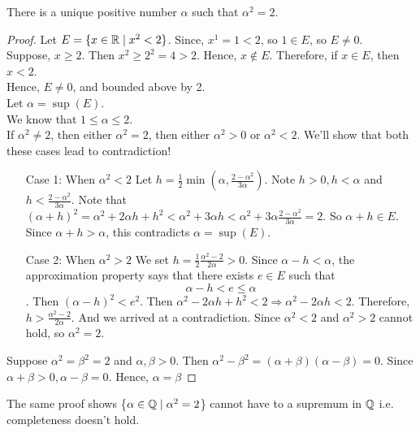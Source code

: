 \documentclass[11pt]{article}
\begin{document}
\begin{theorem}
    There is a unique positive number \(\alpha\) such that \(\alpha^2 = 2\).
\end{theorem}

\begin{proof}
    Let \(E = \{x \in \mathbb R \mid x^2 < 2\}\). Since, \(x^1 = 1 < 2\), so \(1 \in E\), so \(E \neq 0\). \\
    Suppose, \(x \geqslant 2\). Then \(x^2 \geqslant 2^2 = 4 > 2\). Hence, \(x \notin E\).
    Therefore, if \(x \in E\), then \(x < 2\). \\
    Hence, \(E \neq 0\), and bounded above by 2. \\
    Let \(\alpha = \sup(E)\). \\
    We know that \(1 \leqslant \alpha \leqslant 2\). \\
    If \(\alpha^2 \neq 2\), then either \(\alpha^2 = 2\), then either \(\alpha^2 > 0\) or \(\alpha^2 < 2\). We'll show that both these cases lead to contradiction!
    \begin{itemize}
        \item[Case 1:] When \(\alpha^2 < 2\) Let \(h = \frac{1}{2} \min(\alpha, \frac{2 -
                \alpha^2}{3\alpha})\). Note \(h > 0, h < \alpha\) and \(h < \frac{2
                -\alpha^2}{3\alpha}\). Note that \((\alpha + h)^2 = \alpha^2 + 2\alpha h + h^2
            < \alpha^2 + 3\alpha h < \alpha^2 + 3\alpha \frac{2 - \alpha^2}{3\alpha} = 2\).
            So \(\alpha + h \in E\). Since \(\alpha + h > \alpha\), this contradicts
            \(\alpha = \sup(E)\).
        \item[Case 2:] When \(\alpha^2 > 2\) We set \(h = \frac{1}{2} \frac{\alpha^2 -
                2}{2\alpha} > 0\). Since \(\alpha - h < \alpha\), the approximation property
            says that there exists \(e \in E\) such that \[\alpha - h < e \leqslant \alpha\]. Then \((\alpha - h)^2 < e^2\). Then \(\alpha^2 - 2\alpha h + h^2 < 2 \Rightarrow \alpha^2 - 2\alpha h < 2\). Therefore, \(h > \frac{\alpha^2 - 2}{2\alpha}\). And we arrived at a contradiction. Since \(\alpha^2 < 2\) and \(\alpha^2 > 2\) cannot hold, so \(\alpha^2 = 2\).
    \end{itemize}
    Suppose \(\alpha^2 = \beta^2 = 2\) and \(\alpha, \beta > 0\). Then \(\alpha^2 - \beta^2 = (\alpha + \beta)(\alpha - \beta) = 0\). Since \(\alpha + \beta > 0, \alpha - \beta = 0 \). Hence, \(\alpha = \beta\)
\end{proof}

\begin{remark}
    The same proof shows \{\(\alpha \in \mathbb Q \mid \alpha^2 = 2\)\} cannot have to a supremum in \(\mathbb Q\) i.e. completeness doesn't hold.
\end{remark}
\end{document}
